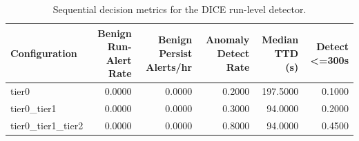 \begin{table}[t]
\centering
\caption{Sequential decision metrics for the DICE run-level detector.}
\label{tab:dice_sequential_metrics}
\footnotesize
\begin{tabular}{lrrrrr}
\toprule
Configuration & Benign Run-Alert Rate & Benign Persist Alerts/hr & Anomaly Detect Rate & Median TTD (s) & Detect <=300s \\
\midrule
tier0 & 0.0000 & 0.0000 & 0.2000 & 197.5000 & 0.1000 \\
tier0_tier1 & 0.0000 & 0.0000 & 0.3000 & 94.0000 & 0.2000 \\
tier0_tier1_tier2 & 0.0000 & 0.0000 & 0.8000 & 94.0000 & 0.4500 \\
\bottomrule
\end{tabular}

\end{table}
